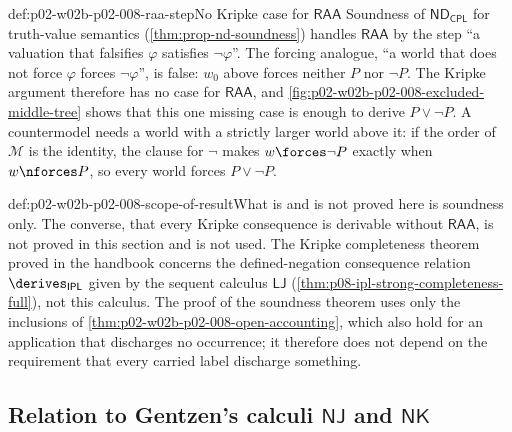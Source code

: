 \begin{hbwarning}{def:p02-w02b-p02-008-raa-step}{No Kripke case for \(\mathsf{RAA}\)}
Soundness of \(\mathsf{ND}_{\mathsf{CPL}}\) for truth-value semantics
(\cref{thm:prop-nd-soundness}) handles \(\mathsf{RAA}\) by the step ``a
valuation that falsifies \(\varphi\) satisfies \(\neg\varphi\)''.  The
forcing analogue, ``a world that does not force \(\varphi\) forces
\(\neg\varphi\)'', is false: \(w_0\) above forces neither \(P\) nor
\(\neg P\).  The Kripke argument therefore has no case for
\(\mathsf{RAA}\), and \cref{fig:p02-w02b-p02-008-excluded-middle-tree} shows
that this one missing case is enough to derive \(P\lor\neg P\).  A
countermodel needs a world with a strictly larger world above it: if the
order of \(\mathcal M\) is the identity, the clause for \(\neg\) makes
\(w\forces\neg P\) exactly when \(w\nforces P\), so every world forces
\(P\lor\neg P\).
\end{hbwarning}

\begin{hbwarning}{def:p02-w02b-p02-008-scope-of-result}{What is and is not proved here}
 is soundness only.  The
converse, that every Kripke consequence is derivable without
\(\mathsf{RAA}\), is not proved in this section and is not used.  The
Kripke completeness theorem proved in the handbook concerns the
defined-negation consequence relation \(\derives_{\mathsf{IPL}}\) given by
the sequent calculus \(\mathsf{LJ}\)
(\cref{thm:p08-ipl-strong-completeness-full}), not this calculus.  The proof of the soundness
theorem uses only the inclusions of
\cref{thm:p02-w02b-p02-008-open-accounting}, which also hold for an
application that discharges no occurrence; it therefore does not depend on
the requirement that every carried label discharge something.
\end{hbwarning}

\subsection{Relation to Gentzen's calculi \(\mathsf{NJ}\) and \(\mathsf{NK}\)}
\label{sec:p02-w02b-p02-008-gentzen}

